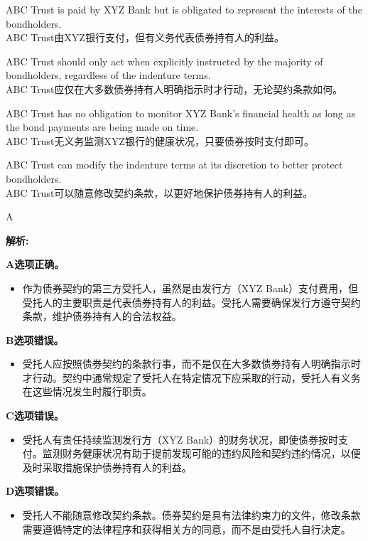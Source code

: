 \documentclass{article}
\newenvironment{explanation}
{\textbf{解析:}\par}
{\par}
\begin{document}
    \begin{choices}
        \item ABC Trust is paid by XYZ Bank but is obligated to represent the interests of the bondholders.\\
        ABC Trust由XYZ银行支付，但有义务代表债券持有人的利益。
        \item ABC Trust should only act when explicitly instructed by the majority of bondholders, regardless of the indenture terms.\\
        ABC Trust应仅在大多数债券持有人明确指示时才行动，无论契约条款如何。
        \item ABC Trust has no obligation to monitor XYZ Bank's financial health as long as the bond payments are being made on time.\\
        ABC Trust无义务监测XYZ银行的健康状况，只要债券按时支付即可。
        \item ABC Trust can modify the indenture terms at its discretion to better protect bondholders.\\
        ABC Trust可以随意修改契约条款，以更好地保护债券持有人的利益。
    \end{choices}
    
    \begin{correctanswer}
        A
    \end{correctanswer}
    
    \begin{explanation}
    \textbf{A选项正确。}
    \begin{itemize}
        \item 作为债券契约的第三方受托人，虽然是由发行方（XYZ Bank）支付费用，但受托人的主要职责是代表债券持有人的利益。受托人需要确保发行方遵守契约条款，维护债券持有人的合法权益。
    \end{itemize}
    \textbf{B选项错误。}
    \begin{itemize}
        \item 受托人应按照债券契约的条款行事，而不是仅在大多数债券持有人明确指示时才行动。契约中通常规定了受托人在特定情况下应采取的行动，受托人有义务在这些情况发生时履行职责。
    \end{itemize}
    \textbf{C选项错误。}
    \begin{itemize}
        \item 受托人有责任持续监测发行方（XYZ Bank）的财务状况，即使债券按时支付。监测财务健康状况有助于提前发现可能的违约风险和契约违约情况，以便及时采取措施保护债券持有人的利益。
    \end{itemize}
    \textbf{D选项错误。}
    \begin{itemize}
        \item 受托人不能随意修改契约条款。债券契约是具有法律约束力的文件，修改条款需要遵循特定的法律程序和获得相关方的同意，而不是由受托人自行决定。
    \end{itemize}
    \end{explanation}
    
\end{document}

